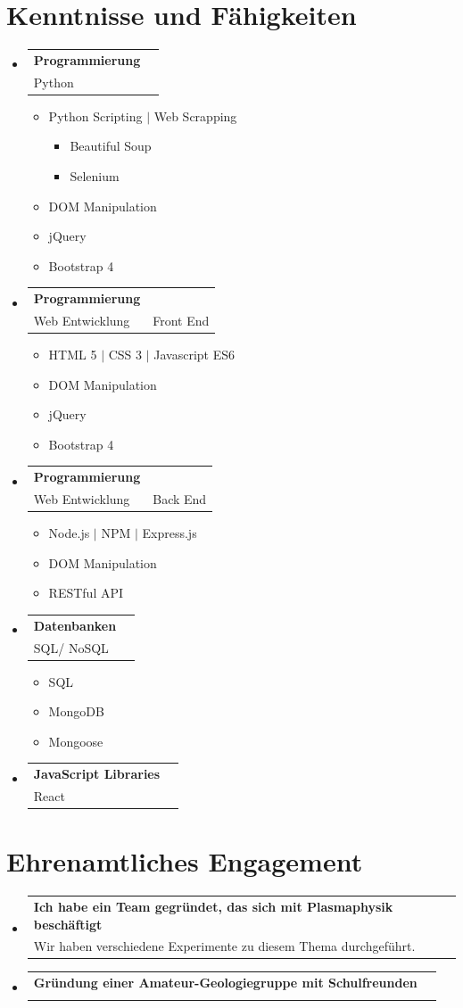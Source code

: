 \documentclass[A4,11pt]{article}
\makeatletter
\newcommand{\CVItem}[1]{
  \item\small{
    {#1 \vspace{-2pt}}
  }
}
\newcommand{\CVSubheading}[4]{
  \vspace{-2pt}\item
    \begin{tabular*}{0.97\textwidth}[t]{l@{\extracolsep{\fill}}r}
      \textbf{#1} & #2 \\
      \small#3 & \small #4 \\
    \end{tabular*}\vspace{-7pt}
}
\newcommand{\CVSubHeadingListStart}{\begin{itemize}[leftmargin=0.5cm, label={}]}
\newcommand{\CVSubHeadingListEnd}{\end{itemize}}
\newcommand{\CVItemListStart}{\begin{itemize}}
\newcommand{\CVItemListEnd}{\end{itemize}\vspace{-5pt}}
\makeatother
\begin{document}

\section{Kenntnisse und Fähigkeiten}
   \CVSubHeadingListStart
   
   \CVSubheading
     {Programmierung}{}
     {Python}{}
      \CVItemListStart
        \CVItem{Python Scripting $|$ Web Scrapping }
        \CVItemListStart
          \CVItem{Beautiful Soup}
          \CVItem{Selenium}
         \CVItemListEnd
          
        \CVItem{DOM Manipulation}
        \CVItem{jQuery}
        \CVItem{Bootstrap 4}
        \CVItemListEnd
   
   
     \CVSubheading
     {Programmierung}{}
     {Web Entwicklung}{Front End}
      \CVItemListStart
        \CVItem{HTML 5 $|$ CSS 3 $|$ Javascript ES6}
        \CVItem{DOM Manipulation}
        \CVItem{jQuery}
        \CVItem{Bootstrap 4}
        \CVItemListEnd
        
     \CVSubheading
     {Programmierung}{}
     {Web Entwicklung}{Back End}
      \CVItemListStart
        \CVItem{Node.js $|$ NPM $|$ Express.js}
        \CVItem{DOM Manipulation}
        \CVItem{RESTful API}
         \CVItemListEnd
         
     \CVSubheading
     {Datenbanken}{}
     {SQL/ NoSQL}{}
      \CVItemListStart
        \CVItem{SQL}
        \CVItem{MongoDB}
        \CVItem{Mongoose}
         \CVItemListEnd
         
     \CVSubheading
     {JavaScript Libraries}{}
     {React}{}
     \CVSubHeadingListEnd










     
    
\section{Ehrenamtliches Engagement}
  \CVSubHeadingListStart
    \CVSubheading
      {Ich habe ein Team gegründet, das sich mit Plasmaphysik beschäftigt}{}
      {Wir haben verschiedene Experimente zu diesem Thema durchgeführt.}{}
    \CVSubheading
      {Gründung einer Amateur-Geologiegruppe mit Schulfreunden}{}
      {}{}
  \CVSubHeadingListEnd
\end{document}
